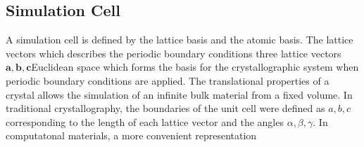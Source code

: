 \subsection{Simulation Cell}
A simulation cell is defined by the lattice basis and the atomic basis.  The lattice vectors which describes the periodic boundary conditions three lattice vectors $\bm{a},\bm{b},\bm{c}$Euclidean space which forms the basis for the crystallographic system when periodic boundary conditions are applied.  The translational properties of a crystal allows the simulation of an infinite bulk material from a fixed volume.  In traditional crystallography, the boundaries of the unit cell were defined as $a,b,c$ corresponding to the length of each lattice vector and the angles $\alpha,\beta,\gamma$.  In computatonal materials, a more convenient representation
